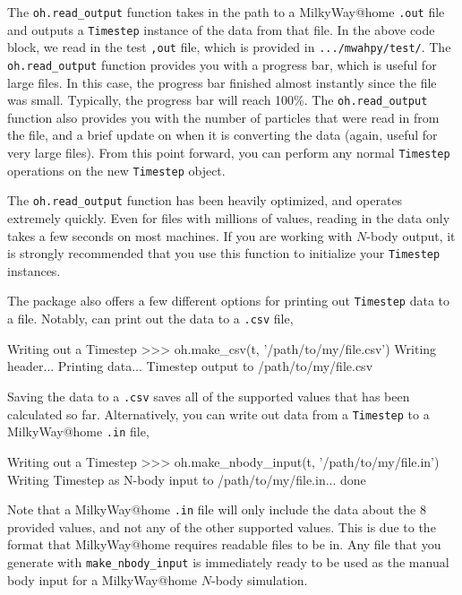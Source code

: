 \documentclass{article}
\begin{document}
The \verb!oh.read_output! function takes in the path to a MilkyWay@home \verb!.out! file and outputs a \verb!Timestep! instance of the data from that file. In the above code block, we read in the test \verb!,out! file, which is provided in \verb!.../mwahpy/test/!. The \verb!oh.read_output! function provides you with a progress bar, which is useful for large files. In this case, the progress bar finished almost instantly since the file was small. Typically, the progress bar will reach 100\%. The \verb!oh.read_output! function also provides you with the number of particles that were read in from the file, and a brief update on when it is converting the data (again, useful for very large files). From this point forward, you can perform any normal \verb!Timestep! operations on the new \verb!Timestep! object. 

The \verb!oh.read_output! function has been heavily optimized, and operates extremely quickly. Even for files with millions of values, reading in the data only takes a few seconds on most machines. If you are working with $N$-body output, it is strongly recommended that you use this function to initialize your \verb!Timestep! instances.

The \mwahpy package also offers a few different options for printing out \verb!Timestep! data to a file. Notably, \mwahpy can print out the data to a \verb!.csv! file, \\

\begin{codelisting}{Writing out a Timestep}
>>> oh.make_csv(t, '/path/to/my/file.csv')
Writing header...
Printing data...
Timestep output to /path/to/my/file.csv
\end{codelisting}

Saving the data to a \verb!.csv! saves all of the supported values that has been calculated so far. Alternatively, you can write out data from a \verb!Timestep! to a MilkyWay@home \verb!.in! file, \\

\begin{codelisting}{Writing out a Timestep}
>>> oh.make_nbody_input(t, '/path/to/my/file.in')
Writing Timestep as N-body input to /path/to/my/file.in...
done
\end{codelisting}

Note that a MilkyWay@home \verb!.in! file will only include the data about the 8 provided values, and not any of the other supported values. This is due to the format that MilkyWay@home requires readable files to be in. Any file that you generate with \verb!make_nbody_input! is immediately ready to be used as the manual body input for a MilkyWay@home $N$-body simulation. 
\end{document}
